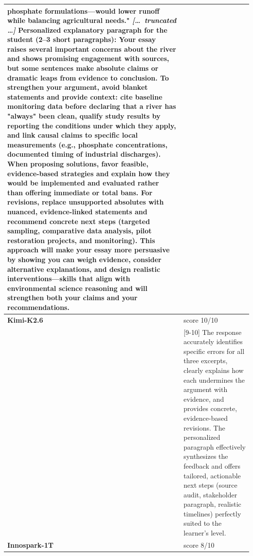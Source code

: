 \begin{longtable}{@{}l p{12.5cm}@{}}
phosphate formulations---would lower runoff while balancing agricultural needs." \newline \textit{[\ldots\ truncated \ldots]} \newline Personalized explanatory paragraph for the student (2--3 short paragraphs): Your essay raises several important concerns about the river and shows promising engagement with sources, but some sentences make absolute claims or dramatic leaps from evidence to conclusion. To strengthen your argument, avoid blanket statements and provide context: cite baseline monitoring data before declaring that a river has "always" been clean, qualify study results by reporting the conditions under which they apply, and link causal claims to specific local measurements (e.g., phosphate concentrations, documented timing of industrial discharges). When proposing solutions, favor feasible, evidence-based strategies and explain how they would be implemented and evaluated rather than offering immediate or total bans. \newline For revisions, replace unsupported absolutes with nuanced, evidence-linked statements and recommend concrete next steps (targeted sampling, comparative data analysis, pilot restoration projects, and monitoring). This approach will make your essay more persuasive by showing you can weigh evidence, consider alternative explanations, and design realistic interventions---skills that align with environmental science reasoning and will strengthen both your claims and your recommendations. \\
  \midrule
  \textbf{Kimi-K2.6} & score 10/10 \\
  & [9-10] The response accurately identifies specific errors for all three excerpts, clearly explains how each undermines the argument with evidence, and provides concrete, evidence-based revisions. The personalized paragraph effectively synthesizes the feedback and offers tailored, actionable next steps (source audit, stakeholder paragraph, realistic timelines) perfectly suited to the learner's level. \\
  \textbf{Innospark-1T} & score 8/10 \\

\end{longtable}
